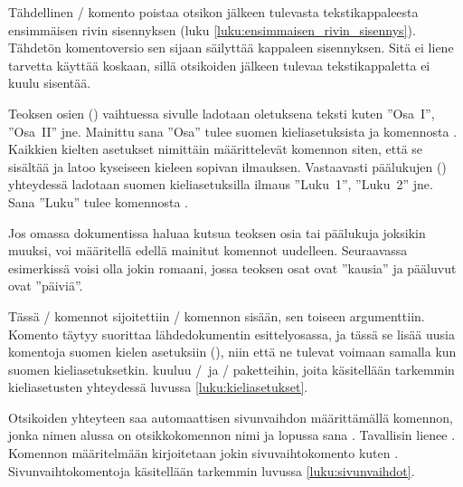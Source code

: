 Tähdellinen \-/ komento poistaa otsikon jälkeen
tulevasta tekstikappaleesta ensimmäisen rivin sisennyksen (luku
\ref{luku:ensimmaisen_rivin_sisennys}). Tähdetön komentoversio
 sen sijaan säilyttää kappaleen sisennyksen. Sitä
ei liene tarvetta käyttää koskaan, sillä otsikoiden jälkeen tulevaa
tekstikappaletta ei kuulu sisentää.

Teoksen osien () vaihtuessa sivulle ladotaan oletuksena
teksti kuten ''Osa~I'', ''Osa~II'' jne. Mainittu sana ''Osa'' tulee
suomen kieliasetuksista ja komennosta . Kaikkien
kielten asetukset nimittäin määrittelevät komennon 
siten, että se sisältää ja latoo kyseiseen kieleen sopivan ilmauksen.
Vastaavasti päälukujen () yhteydessä ladotaan suomen
kieliasetuksilla ilmaus ''Luku~1'', ''Luku~2'' jne. Sana ''Luku'' tulee
komennosta .

Jos omassa dokumentissa haluaa kutsua teoksen osia tai päälukuja
joksikin muuksi, voi määritellä edellä mainitut komennot uudelleen.
Seuraavassa esimerkissä voisi olla jokin romaani, jossa teoksen osat
ovat ''kausia'' ja pääluvut ovat ''päiviä''.

\begin{koodilohkosis}
  \addto{\captionsfinnish}{
    \renewcommand{\partname}{Kausi}
    \renewcommand{\chaptername}{Päivä}
  }
\end{koodilohkosis}

Tässä \-/ komennot sijoitettiin \-/
komennon sisään, sen toiseen argumenttiin. Komento 
täytyy suorittaa lähdedokumentin esittelyosassa, ja tässä se lisää uusia
komentoja suomen kielen asetuksiin (), niin
että ne tulevat voimaan samalla kun suomen kieliasetuksetkin.
 kuuluu \-/\ ja \-/
paketteihin, joita käsitellään tarkemmin kieliasetusten yhteydessä
luvussa \ref{luku:kieliasetukset}.

Otsikoiden yhteyteen saa automaattisen sivunvaihdon määrittämällä
komennon, jonka nimen alussa on otsikkokomennon nimi ja lopussa sana
. Tavallisin lienee . Komennon
määritelmään kirjoitetaan jokin sivuvaihtokomento kuten
. Sivunvaihtokomentoja käsitellään tarkemmin luvussa
\ref{luku:sivunvaihdot}.

